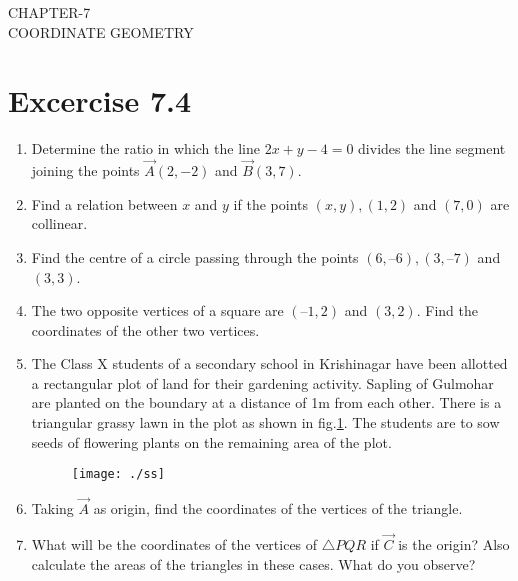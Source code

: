 \documentclass[12pt]{article}
\begin{document}
\begin{center}
\textbf\large{CHAPTER-7 \\ COORDINATE GEOMETRY}

\end{center}
\section*{Excercise 7.4}
\fi
\begin{enumerate}[label=\thesection.\arabic*,ref=\thesection.\theenumi]
\item Determine the ratio in which the line $2x+y  - 4=0$ divides the line segment joining the points $\vec{A}(2, - 2)$  and  $\vec{B}(3, 7)$.
\item Find a relation between $x$ and $y$ if the points $(x, y), (1, 2)$  and  $(7, 0)$ are collinear.

\item Find the centre of a circle passing through the points $(6, – 6), (3, – 7)$ and $ (3, 3)$.

\item The two opposite vertices of a square are $(–1, 2)$  and $ (3, 2)$. Find the coordinates of the other two vertices.

\iffalse
\item The Class X students of a secondary school in Krishinagar have been allotted a rectangular plot of land for their gardening activity. Sapling of Gulmohar are planted on the boundary at a distance of 1m from each other. There is a triangular grassy lawn in the plot as shown in fig.\ref{fig:Fig1}. The students are to sow seeds of flowering plants on the remaining area of the plot.\\

\begin{figure}[!h]
	\begin{center} 
	    \texttt{[image: ./ss]}
	\end{center}
\caption{}
\label{fig:Fig1}
\end{figure}
\item Taking $\vec{A}$ as origin, find the coordinates of the vertices of the triangle.
\item What will be the coordinates of the vertices of $\triangle PQR$ if $\vec{C}$ is the origin?
Also calculate the areas of the triangles in these cases. What do you observe?
\end{enumerate}
\end{document}
